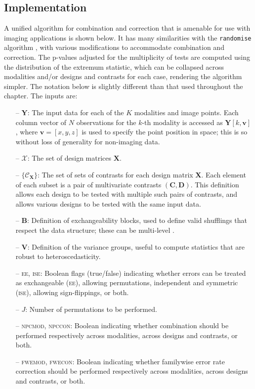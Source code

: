 \subsection{Implementation}
\label{sec:comb:implementation}

A unified algorithm for combination and correction that is amenable for use with imaging applications is shown below. It has many similarities with the \texttt{randomise} algorithm \citep[Section \ref{sec:perm:randomise};][]{Winkler2014}, with various modifications to accommodate combination and correction. The p-values adjusted for the multiplicity of tests are computed using the distribution of the extremum statistic, which can be collapsed across modalities and/or designs and contrasts for each case, rendering the algorithm simpler. The notation below is slightly different than that used throughout the chapter. The inputs are:

\begin{itemize}
\item[--] $\mathbf{Y}$: The input data for each of the $K$ modalities and image points. Each column vector of $N$ observations for the $k$-th modality is accessed as $\mathbf{Y}[k,\mathbf{v}]$, where $\mathbf{v}=[x, y, z]$ is used to specify the point position in space; this is so without loss of generality for non-imaging data.
\item[--] $\mathcal{X}$:  The set of design matrices $\mathbf{X}$.
\item[--] $\{\mathcal{C}_\mathbf{X}\}$: The set of sets of contrasts for each design matrix $\mathbf{X}$. Each element of each subset is a pair of multivariate contrasts $(\mathbf{C},\mathbf{D})$. This definition allows each design to be tested with multiple such pairs of contrasts, and allows various designs to be tested with the same input data.
\item[--] $\mathbf{B}$: Definition of exchangeability blocks, used to define valid shufflings that respect the data structure; these can be multi-level \citep{Winkler2015}.
\item[--] $\mathbf{V}$: Definition of the variance groups, useful to compute statistics that are robust to heteroscedasticity.
\item[--] \textsc{ee}, \textsc{ise}: Boolean flags (true/false) indicating whether errors can be treated as exchangeable (\textsc{ee}), allowing permutations, independent and symmetric (\textsc{ise}), allowing sign-flippings, or both.
\item[--] $J$: Number of permutations to be performed.
\item[--] \textsc{npcmod}, \textsc{npccon}: Boolean indicating whether combination should be performed respectively across modalities, across designs and contrasts, or both.
\item[--] \textsc{fwemod}, \textsc{fwecon}: Boolean indicating whether familywise error rate correction should be performed respectively across modalities, across designs and contrasts, or both.
\end{itemize}


